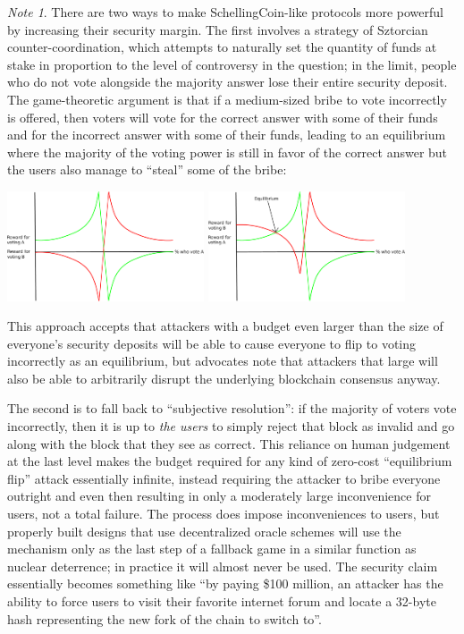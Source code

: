 \documentclass[11pt,a4paper]{report}
\theoremstyle{plain}
\theoremstyle{definition}
\theoremstyle{remark}
\newtheorem*{note}{Note}
\begin{document}
\begin{note}
There are two ways to make SchellingCoin-like protocols more powerful by increasing their security margin. The first involves a strategy of Sztorcian counter-coordination\cite{sztorc}, which attempts to naturally set the quantity of funds at stake in proportion to the level of controversy in the question; in the limit, people who do not vote alongside the majority answer lose their entire security deposit. The game-theoretic argument is that if a medium-sized bribe to vote incorrectly is offered, then voters will vote for the correct answer with some of their funds and for the incorrect answer with some of their funds, leading to an equilibrium where the majority of the voting power is still in favor of the correct answer but the users also manage to ``steal'' some of the bribe:

\begin{center}
\includegraphics[width=165pt]{figs/pdfs/schellingcoin_payoff1.pdf}
\includegraphics[width=165pt]{figs/pdfs/schellingcoin_payoff2.pdf}
\end{center}

This approach accepts that attackers with a budget even larger than the size of everyone's security deposits will be able to cause everyone to flip to voting incorrectly as an equilibrium, but advocates note that attackers that large will also be able to arbitrarily disrupt the underlying blockchain consensus anyway.

The second is to fall back to ``subjective resolution'': if the majority of voters vote incorrectly, then it is up to \emph{the users} to simply reject that block as invalid and go along with the block that they see as correct. This reliance on human judgement at the last level makes the budget required for any kind of zero-cost ``equilibrium flip'' attack essentially infinite, instead requiring the attacker to bribe everyone outright and even then resulting in only a moderately large inconvenience for users, not a total failure. The process does impose inconveniences to users, but properly built designs that use decentralized oracle schemes will use the mechanism only as the last step of a fallback game in a similar function as nuclear deterrence; in practice it will almost never be used. The security claim essentially becomes something like ``by paying \$100 million, an attacker has the ability to force users to visit their favorite internet forum and locate a 32-byte hash representing the new fork of the chain to switch to''.
\end{note}
\end{document}
